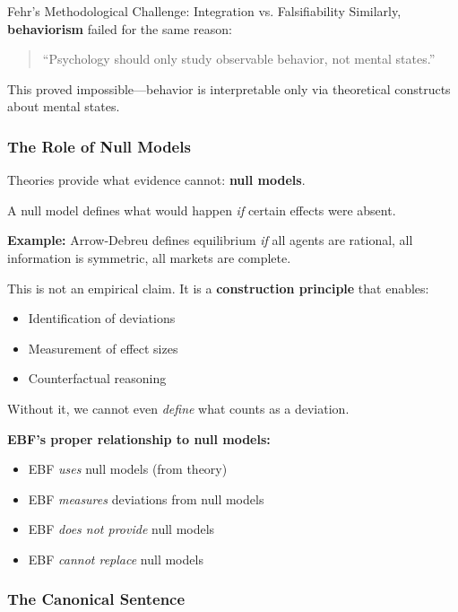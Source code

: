 \begin{chapter}{Fehr's Methodological Challenge: Integration vs. Falsifiability}
Similarly, \textbf{behaviorism} failed for the same reason:
\begin{quote}
``Psychology should only study observable behavior, not mental states.''
\end{quote}
This proved impossible---behavior is interpretable only via theoretical constructs about mental states.

\subsubsection{The Role of Null Models}

Theories provide what evidence cannot: \textbf{null models}.

\begin{tcolorbox}[colback=gray!10!white,colframe=gray!75!black,title=\textbf{Why Null Models Are Trans-Empirical}]
A null model defines what would happen \textit{if} certain effects were absent.

\textbf{Example:} Arrow-Debreu defines equilibrium \textit{if} all agents are rational, all information is symmetric, all markets are complete.

This is not an empirical claim. It is a \textbf{construction principle} that enables:
\begin{itemize}[noitemsep]
    \item Identification of deviations
    \item Measurement of effect sizes
    \item Counterfactual reasoning
\end{itemize}

Without it, we cannot even \textit{define} what counts as a deviation.
\end{tcolorbox}

\textbf{EBF's proper relationship to null models:}
\begin{itemize}[noitemsep]
    \item EBF \textit{uses} null models (from theory)
    \item EBF \textit{measures} deviations from null models
    \item EBF \textit{does not provide} null models
    \item EBF \textit{cannot replace} null models
\end{itemize}

\subsubsection{The Canonical Sentence}


\end{chapter}
